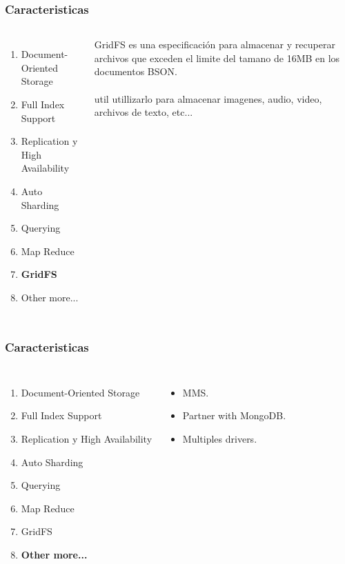 \documentclass{beamer}
\begin{document}
\begin{frame}
\frametitle{Caracteristicas}
\begin{columns}[c] %

\begin{enumerate}
\item Document-Oriented Storage
\item Full Index Support
\item Replication y High Availability
\item Auto Sharding
\item Querying
\item Map Reduce
\item \textbf{GridFS}
\item Other more...
\end{enumerate}

GridFS es una especificaci\'on para almacenar y recuperar archivos que exceden el limite del tamano de 16MB en los documentos BSON.
\\~\\
util utillizarlo para almacenar imagenes, audio, video, archivos de texto, etc...
\end{columns}
\end{frame}


\begin{frame}
\frametitle{Caracteristicas}
\begin{columns}[c] %

\begin{enumerate}
\item Document-Oriented Storage
\item Full Index Support
\item Replication y High Availability
\item Auto Sharding
\item Querying
\item Map Reduce
\item GridFS
\item \textbf{Other more...}
\end{enumerate}

\begin{itemize}
\item MMS.
\item Partner with MongoDB.
\item Multiples drivers.
\end{itemize}

\end{columns}
\end{frame}
\end{document}
